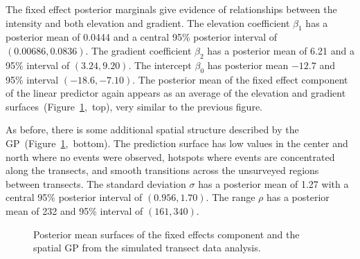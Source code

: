 \documentclass{interact}
\begin{document}
The fixed effect posterior marginals give evidence of relationships between
the intensity and both elevation and gradient. The elevation coefficient
\(\beta_{1}\) has a posterior mean of 0.0444 and a central 95\% posterior
interval of \((0.00686, 0.0836)\). The gradient coefficient \(\beta_{2}\) has
a posterior mean of 6.21 and a 95\% interval of \((3.24, 9.20)\). The
intercept \(\beta_{0}\) has posterior mean \(-12.7\) and 95\% interval
\((-18.6, -7.10)\). The posterior mean of the fixed effect component of the
linear predictor again appears as an average of the elevation and gradient
surfaces~(Figure~\ref{effortmean},~top), very similar to the previous figure.

As before, there is some additional spatial structure described by the
GP~(Figure~\ref{effortmean},~bottom). The prediction surface has low values
in the center and north where no events were observed, hotspots where events
are concentrated along the transects, and smooth transitions across the
unsurveyed regions between transects. The standard deviation \(\sigma\) has a
posterior mean of 1.27 with a central 95\% posterior interval of
\((0.956, 1.70)\). The range \(\rho\) has a posterior mean of 232 and
95\% interval of \((161, 340)\).

\begin{figure}[t!]\centering



\caption{Posterior mean surfaces of the fixed effects component and the
spatial GP from the simulated transect data analysis.}
\label{effortmean}
\end{figure}
\end{document}
